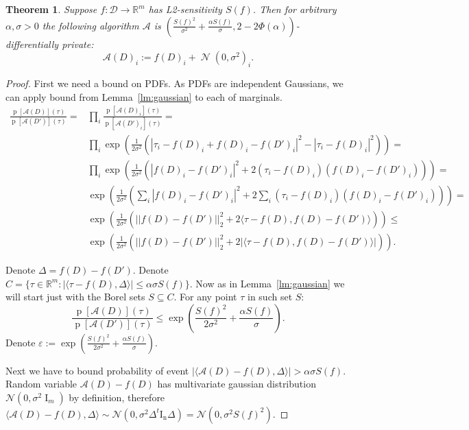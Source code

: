 \documentclass[12pt,letterpaper]{article}
\newcommand{\R}{\mathbb{R}}
\let\eps\varepsilon
\newcommand{\p}{\operatorname{p}}
\newtheorem{theorem}{Theorem}
\newcommand{\No}{\mathcal{N}}
\begin{document}
\begin{theorem}
\label{tm:gaussian}
Suppose $f: \mathcal{D} \to \R^m$ has L2-sensitivity $S(f)$. Then for arbitrary $\alpha, \sigma > 0$ the following algorithm $\mathcal{A}$ is $\left(\frac{S(f)^2}{\sigma^2} + \frac{\alpha S(f)}{\sigma}, 2 - 2\Phi(\alpha)\right)$-differentially private:
$$\mathcal{A}(D)_i := f(D)_i + \operatorname{\No}(0, \sigma^2)_i.$$
\end{theorem}
\begin{proof}
First we need a bound on PDFs. As PDFs are independent Gaussians, we can apply bound from Lemma~\ref{lm:gaussian} to each of marginals.
\begin{align*}
  \frac{\p[\mathcal{A}(D)](\tau)}{\p[\mathcal{A}(D')](\tau)} = &\prod_{i}\frac{\p[\mathcal{A}(D)_i](\tau)}{\p[\mathcal{A}(D')_i](\tau)} = 
   \\
   &\prod_{i}\exp\left(\frac{1}{2\sigma^2}(|\tau_i - f(D)_i + f(D)_i - f(D')_i|^2 - |\tau_i - f(D)_i|^2)\right) = \\
   &\prod_{i}\exp\left(\frac{1}{2\sigma^2}(|f(D)_i - f(D')_i|^2 + 2(\tau_i - f(D)_i)(f(D)_i - f(D')_i))\right) = \\
   &\exp\left(\frac{1}{2\sigma^2}\left(\sum_{i}|f(D)_i - f(D')_i|^2 + 2\sum_{i}(\tau_i - f(D)_i)(f(D)_i - f(D')_i)\right)\right) = \\
   &\exp\left(\frac{1}{2\sigma^2}(||f(D) - f(D')||_2^2 + 2\langle\tau - f(D), f(D) - f(D')\rangle)\right) \leq \\
   &\exp\left(\frac{1}{2\sigma^2}(||f(D) - f(D')||_2^2 + 2|\langle\tau - f(D), f(D) - f(D')\rangle|)\right).
\end{align*}

Denote $\Delta = f(D) - f(D')$. Denote $C = \{\tau \in \R^m: |\langle \tau - f(D), \Delta\rangle| \leq \alpha\sigma S(f)\}$.
Now as in Lemma~\ref{lm:gaussian} we will start just with the Borel sets $S \subseteq C$. For any point $\tau$ in such set $S$:
$$\frac{\p[\mathcal{A}(D)](\tau)}{\p[\mathcal{A}(D')](\tau)} \leq \exp(\frac{S(f)^2}{2\sigma^2} + \frac{\alpha S(f)}{\sigma}).$$
Denote $\eps := \exp(\frac{S(f)^2}{2\sigma^2} + \frac{\alpha S(f)}{\sigma})$.

Next we have to bound probability of event $|\langle \mathcal{A}(D) - f(D), \Delta\rangle| > \alpha\sigma S(f)$.
Random variable $\mathcal{A}(D) - f(D)$ has multivariate gaussian distribution $\No(0, \sigma^2\operatorname{I}_m)$ by definition, therefore $\langle \mathcal{A}(D) - f(D), \Delta\rangle \sim \No(0, \sigma^2\Delta^t\operatorname{I_n}\Delta) = \No(0, \sigma^2S(f)^2)$.


\end{proof}
\end{document}
